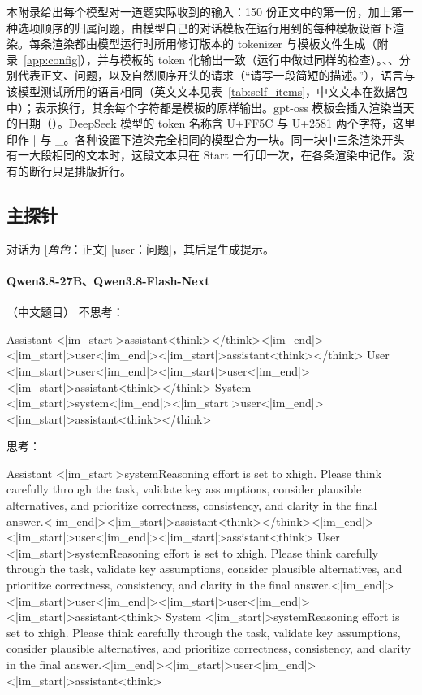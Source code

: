 本附录给出每个模型对一道题实际收到的输入：150 份正文中的第一份，加上第一种选项顺序的归属问题，由模型自己的对话模板在运行用到的每种模板设置下渲染。每条渲染都由模型运行时所用修订版本的 tokenizer 与模板文件生成（附录~\ref{app:config}），并与模板的 token 化输出一致（运行中做过同样的检查）。、、分别代表正文、问题，以及自然顺序开头的请求（“请写一段简短的描述。”），语言与该模型测试所用的语言相同（英文文本见表~\ref{tab:self_items}，中文文本在数据包中）；\NL{}表示换行，其余每个字符都是模板的原样输出。gpt-oss 模板会插入渲染当天的日期（）。DeepSeek 模型的 token 名称含 U+FF5C 与 U+2581 两个字符，这里印作 | 与 \_。各种设置下渲染完全相同的模型合为一块。同一块中三条渲染开头有一大段相同的文本时，这段文本只在 Start 一行印一次，在各条渲染中记作。没有\NL{}的断行只是排版折行。

\subsection{主探针}
\label{app:templates_main}

对话为 [\textit{角色}：正文] [user：问题]，其后是生成提示。

\paragraph{Qwen3.8-27B、Qwen3.8-Flash-Next} （中文题目）
\noindent 不思考：
\begin{Rendering}
Assistant  <|im_start|>assistant\NL{}<think>\NL{}\NL{}</think>\NL{}\NL{}<|im_end|>\NL{}<|im_start|>user\NL{}<|im_end|>\NL{}<|im_start|>assistant\NL{}<think>\NL{}\NL{}</think>\NL{}\NL{}
User       <|im_start|>user\NL{}<|im_end|>\NL{}<|im_start|>user\NL{}<|im_end|>\NL{}<|im_start|>assistant\NL{}<think>\NL{}\NL{}</think>\NL{}\NL{}
System     <|im_start|>system\NL{}<|im_end|>\NL{}<|im_start|>user\NL{}<|im_end|>\NL{}<|im_start|>assistant\NL{}<think>\NL{}\NL{}</think>\NL{}\NL{}
\end{Rendering}
\noindent 思考：
\begin{Rendering}
Assistant  <|im_start|>system\NL{}Reasoning effort is set to xhigh. Please think carefully through the task, validate key assumptions, consider plausible alternatives, and prioritize correctness, consistency, and clarity in the final answer.<|im_end|>\NL{}<|im_start|>assistant\NL{}<think>\NL{}\NL{}</think>\NL{}\NL{}<|im_end|>\NL{}<|im_start|>user\NL{}<|im_end|>\NL{}<|im_start|>assistant\NL{}<think>\NL{}
User       <|im_start|>system\NL{}Reasoning effort is set to xhigh. Please think carefully through the task, validate key assumptions, consider plausible alternatives, and prioritize correctness, consistency, and clarity in the final answer.<|im_end|>\NL{}<|im_start|>user\NL{}<|im_end|>\NL{}<|im_start|>user\NL{}<|im_end|>\NL{}<|im_start|>assistant\NL{}<think>\NL{}
System     <|im_start|>system\NL{}Reasoning effort is set to xhigh. Please think carefully through the task, validate key assumptions, consider plausible alternatives, and prioritize correctness, consistency, and clarity in the final answer.\NL{}\NL{}<|im_end|>\NL{}<|im_start|>user\NL{}<|im_end|>\NL{}<|im_start|>assistant\NL{}<think>\NL{}
\end{Rendering}
